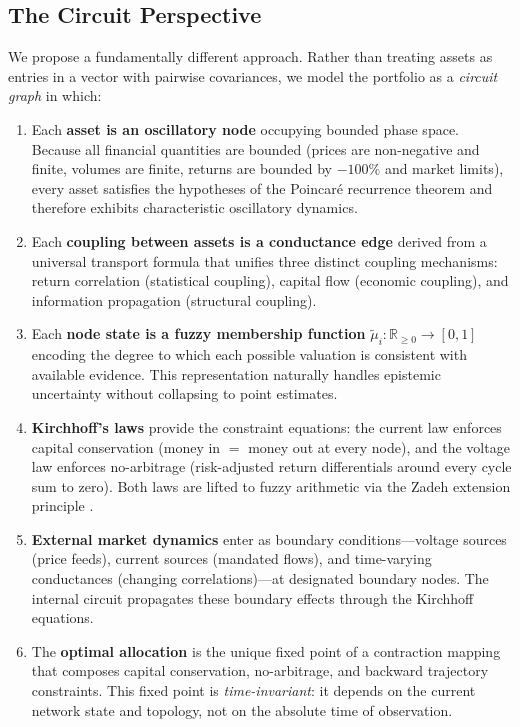 \documentclass[twocolumn,10pt]{article}
\theoremstyle{remark}
\newcommand{\fuzzyset}[1]{\tilde{\mu}_{#1}}
\begin{document}
\subsection{The Circuit Perspective}

We propose a fundamentally different approach.  Rather than treating assets as entries in a vector with pairwise covariances, we model the portfolio as a \emph{circuit graph} in which:

\begin{enumerate}[label=(\arabic*)]
    \item Each \textbf{asset is an oscillatory node} occupying bounded phase space.  Because all financial quantities are bounded (prices are non-negative and finite, volumes are finite, returns are bounded by $-100\%$ and market limits), every asset satisfies the hypotheses of the Poincar\'{e} recurrence theorem and therefore exhibits characteristic oscillatory dynamics.

    \item Each \textbf{coupling between assets is a conductance edge} derived from a universal transport formula that unifies three distinct coupling mechanisms: return correlation (statistical coupling), capital flow (economic coupling), and information propagation (structural coupling).

    \item Each \textbf{node state is a fuzzy membership function} $\fuzzyset{i} : \mathbb{R}_{\geq 0} \to [0,1]$ encoding the degree to which each possible valuation is consistent with available evidence.  This representation naturally handles epistemic uncertainty without collapsing to point estimates.

    \item \textbf{Kirchhoff's laws} provide the constraint equations: the current law enforces capital conservation (money in $=$ money out at every node), and the voltage law enforces no-arbitrage (risk-adjusted return differentials around every cycle sum to zero).  Both laws are lifted to fuzzy arithmetic via the Zadeh extension principle \cite{zadeh1965}.

    \item \textbf{External market dynamics} enter as boundary conditions---voltage sources (price feeds), current sources (mandated flows), and time-varying conductances (changing correlations)---at designated boundary nodes.  The internal circuit propagates these boundary effects through the Kirchhoff equations.

    \item The \textbf{optimal allocation} is the unique fixed point of a contraction mapping that composes capital conservation, no-arbitrage, and backward trajectory constraints.  This fixed point is \emph{time-invariant}: it depends on the current network state and topology, not on the absolute time of observation.
\end{enumerate}
\end{document}
